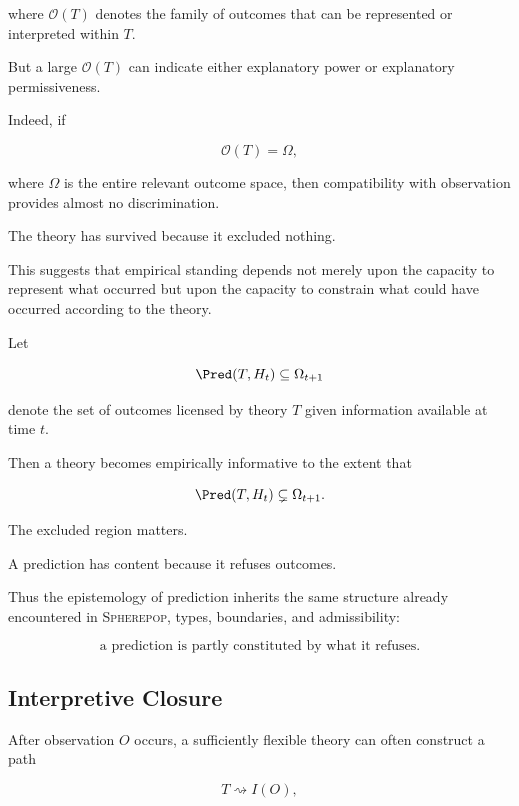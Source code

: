 \documentclass[11pt]{article}
\theoremstyle{remark}
\newcommand{\Spherepop}{\textsc{Spherepop}}
\begin{document}
where $\mathcal{O}(T)$ denotes the family of outcomes that can be represented or interpreted within $T$.

But a large $\mathcal{O}(T)$ can indicate either explanatory power or explanatory permissiveness.

Indeed, if

\begin{equation}
\mathcal{O}(T)=\Omega,
\end{equation}

where $\Omega$ is the entire relevant outcome space, then compatibility with observation provides almost no discrimination.

The theory has survived because it excluded nothing.

This suggests that empirical standing depends not merely upon the capacity to represent what occurred but upon the capacity to constrain what could have occurred according to the theory.

Let

\begin{equation}
\Pred(T,H_t)
\subseteq
\Omega_{t+1}
\end{equation}

denote the set of outcomes licensed by theory $T$ given information available at time $t$.

Then a theory becomes empirically informative to the extent that

\begin{equation}
\Pred(T,H_t)
\subsetneq
\Omega_{t+1}.
\end{equation}

The excluded region matters.

A prediction has content because it refuses outcomes.

Thus the epistemology of prediction inherits the same structure already encountered in \Spherepop{}, types, boundaries, and admissibility:

\begin{equation}
\boxed{
\text{a prediction is partly constituted by what it refuses}.
}
\end{equation}

\subsection{Interpretive Closure}

After observation $O$ occurs, a sufficiently flexible theory can often construct a path

\begin{equation}
T
\rightsquigarrow
I(O),
\end{equation}
\end{document}
